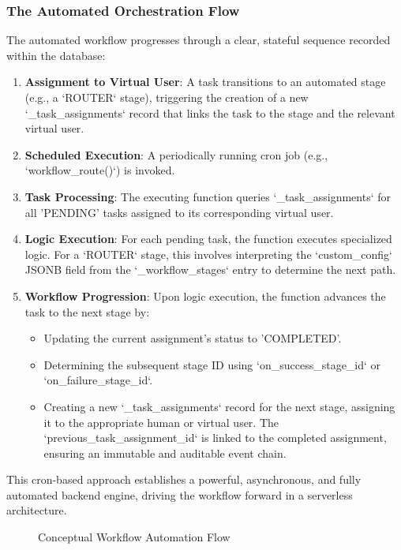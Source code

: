 \subsubsection{The Automated Orchestration Flow}
The automated workflow progresses through a clear, stateful sequence recorded within the database:
\begin{enumerate}
    \item \textbf{Assignment to Virtual User}: A task transitions to an automated stage (e.g., a `ROUTER` stage), triggering the creation of a new `\_task\_assignments` record that links the task to the stage and the relevant virtual user.
    \item \textbf{Scheduled Execution}: A periodically running cron job (e.g., `workflow\_route()`) is invoked.
    \item \textbf{Task Processing}: The executing function queries `\_task\_assignments` for all 'PENDING' tasks assigned to its corresponding virtual user.
    \item \textbf{Logic Execution}: For each pending task, the function executes specialized logic. For a `ROUTER` stage, this involves interpreting the `custom\_config` JSONB field from the `\_workflow\_stages` entry to determine the next path.
    \item \textbf{Workflow Progression}: Upon logic execution, the function advances the task to the next stage by:
    \begin{itemize}
        \item Updating the current assignment's status to 'COMPLETED'.
        \item Determining the subsequent stage ID using `on\_success\_stage\_id` or `on\_failure\_stage\_id`.
        \item Creating a new `\_task\_assignments` record for the next stage, assigning it to the appropriate human or virtual user. The `previous\_task\_assignment\_id` is linked to the completed assignment, ensuring an immutable and auditable event chain.
    \end{itemize}
\end{enumerate}
This cron-based approach establishes a powerful, asynchronous, and fully automated backend engine, driving the workflow forward in a serverless architecture.

\begin{figure}[h!]
    \centering
    \caption{Conceptual Workflow Automation Flow}
    \label{fig:automation-flow}
\end{figure}

